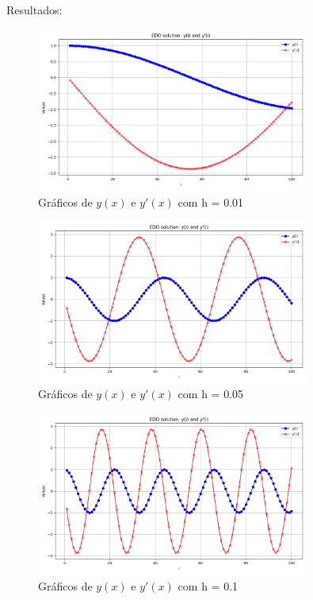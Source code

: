 \documentclass[12pt, a4paper]{article} %
\begin{document}
        Resultados:
        \begin{figure}[H]
            \centering
            \includegraphics[width=0.8\textwidth]{../images/results-ex-2-2.png}
            \caption{Gr\'aficos de $y(x)$ e $y'(x)$ com h = 0.01}
        \end{figure}
        \begin{figure}[H]
            \centering
            \includegraphics[width=0.8\textwidth]{../images/results-ex-2-4.png}
            \caption{Gr\'aficos de $y(x)$ e $y'(x)$ com h = 0.05}
        \end{figure}
        \begin{figure}[H]
            \centering
            \includegraphics[width=0.8\textwidth]{../images/results-ex-2-1.png}
            \caption{Gr\'aficos de $y(x)$ e $y'(x)$ com h = 0.1}
        \end{figure}
\end{document}
